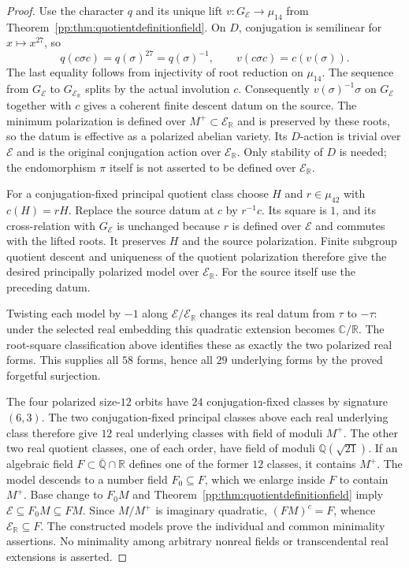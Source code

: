 \begin{proof}
Use the character $q$ and its unique lift
$v:G_{\mathcal E}\longrightarrow\mu_{14}$ from
Theorem~\ref{pp:thm:quotientdefinitionfield}.
On $D$, conjugation is semilinear for $x\mapsto x^{27}$, so
\[
 q(c\sigma c)=q(\sigma)^{27}=q(\sigma)^{-1},
 \qquad v(c\sigma c)=c(v(\sigma)).
\]
The last equality follows from injectivity of root reduction on
$\mu_{14}$. The sequence from $G_{\mathcal E}$ to
$G_{\mathcal E_{\mathbb R}}$ splits by the actual involution $c$.
Consequently $v(\sigma)^{-1}\sigma$ on $G_{\mathcal E}$ together
with $c$ gives a coherent finite descent datum on the source.
The minimum polarization is defined over
$M^+\subset\mathcal E_{\mathbb R}$ and is preserved by these roots,
so the datum is effective as a polarized abelian variety.
Its $D$-action is trivial over $\mathcal E$ and is the original
conjugation action over $\mathcal E_{\mathbb R}$.
Only stability of $D$ is needed; the endomorphism $\pi$ itself is
not asserted to be defined over $\mathcal E_{\mathbb R}$.

For a conjugation-fixed principal quotient class choose $H$ and
$r\in\mu_{42}$ with $c(H)=rH$. Replace the source datum at $c$
by $r^{-1}c$. Its square is $1$, and its cross-relation with
$G_{\mathcal E}$ is unchanged because $r$ is defined over
$\mathcal E$ and commutes with the lifted roots. It preserves
$H$ and the source polarization. Finite subgroup quotient descent
and uniqueness of the quotient polarization therefore give the
desired principally polarized model over $\mathcal E_{\mathbb R}$.
For the source itself use the preceding datum.

Twisting each model by $-1$ along
$\mathcal E/\mathcal E_{\mathbb R}$ changes its real datum
from $\tau$ to $-\tau$: under the selected real embedding this
quadratic extension becomes $\mathbb C/\mathbb R$.
The root-square classification above identifies these as exactly
the two polarized real forms. This supplies all $58$ forms, hence
all $29$ underlying forms by the proved forgetful surjection.

The four polarized size-$12$ orbits have $24$ conjugation-fixed
classes by signature $(6,3)$. The two conjugation-fixed principal
classes above each real underlying class therefore give $12$ real
underlying classes with field of moduli
$M^+$. The other two real quotient classes, one of each order,
have field of moduli $\mathbb Q(\sqrt{21})$.
If an algebraic field $F\subset\overline{\mathbb Q}\cap\mathbb R$
defines one of the former $12$ classes, it contains $M^+$.
The model descends to a number field $F_0\subseteq F$, which we
enlarge inside $F$ to contain $M^+$. Base change to $F_0M$ and
Theorem~\ref{pp:thm:quotientdefinitionfield} imply
$\mathcal E\subseteq F_0M\subseteq FM$. Since $M/M^+$ is imaginary quadratic,
$(FM)^c=F$, whence $\mathcal E_{\mathbb R}\subseteq F$.
The constructed models prove the individual and common minimality
assertions. No minimality among arbitrary nonreal fields or
transcendental real extensions is asserted.
\end{proof}

